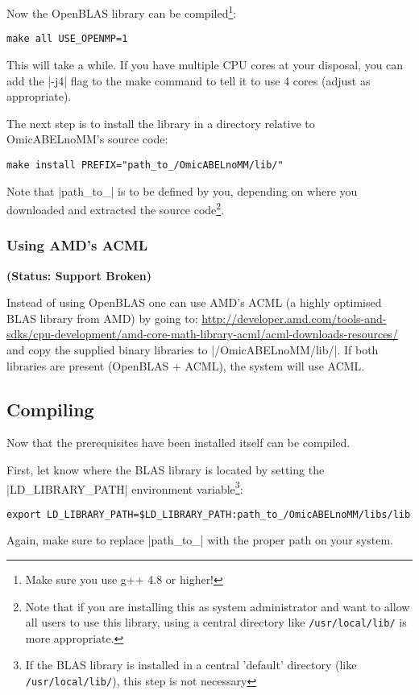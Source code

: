 Now the OpenBLAS library can be compiled\footnote{Make sure you use
  g++ 4.8 or higher!}:
\begin{lstlisting}[escapechar=\%]
make all USE_OPENMP=1
\end{lstlisting}
This will take a while. If you have multiple CPU cores at your
disposal, you can add the |-j4| flag to the make command to tell it to
use 4 cores (adjust as appropriate).

The next step is to install the library in a directory relative to
OmicABELnoMM's source code:
\begin{lstlisting}
make install PREFIX="path_to_/OmicABELnoMM/lib/"
\end{lstlisting}
Note that |path_to_| is to be defined by you, depending on where you
downloaded and extracted the \oanomm source code\footnote{Note that if
you are installing this as system administrator and want to allow all
users to use this library, using a central directory like
\lstinline{/usr/local/lib/} is more appropriate.}.

\subsubsection{Using AMD's \ac{ACML}}
\textbf{(Status: Support Broken)}

Instead of using OpenBLAS one can use AMD's \ac{ACML} (a highly optimised
\ac{BLAS} library from AMD) by going to:
\url{http://developer.amd.com/tools-and-sdks/cpu-development/amd-core-math-library-acml/acml-downloads-resources/}
and copy the supplied binary libraries to |/OmicABELnoMM/lib/|. If
both libraries are present (OpenBLAS + \ac{ACML}), the system will use
\ac{ACML}.


\subsection{Compiling \oanomm}
\label{sec:compiling-oanomm}
Now that the prerequisites have been installed \oanomm itself can be compiled.

First, let \oanomm know where the \ac{BLAS} library is located by
setting the |LD_LIBRARY_PATH| environment variable\footnote{If the
  \ac{BLAS} library is installed in a central 'default' directory
  (like \lstinline{/usr/local/lib/}), this step is not necessary}:
\begin{lstlisting}[basicstyle=\footnotesize\ttfamily]
export LD_LIBRARY_PATH=$LD_LIBRARY_PATH:path_to_/OmicABELnoMM/libs/lib
\end{lstlisting}
Again, make sure to replace |path_to_| with the proper path on your system.

